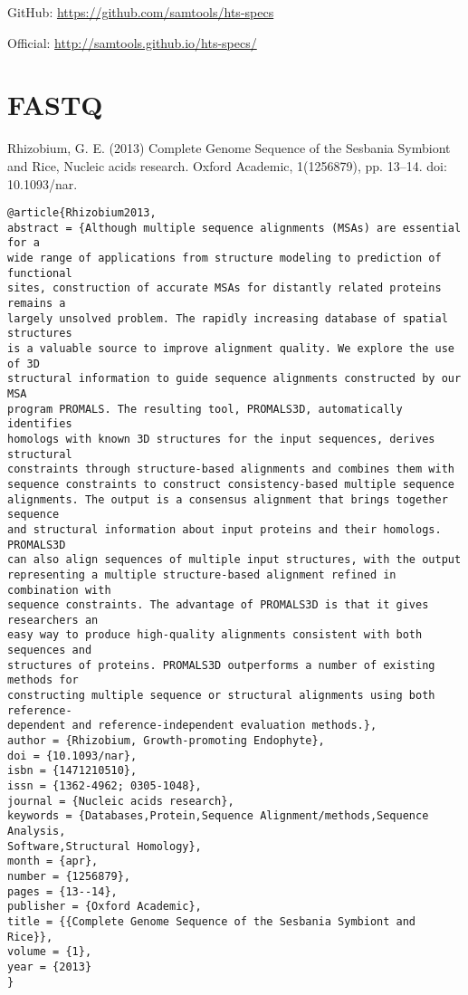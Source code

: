 \documentclass[]{article}
\begin{document}
GitHub: \url{https://github.com/samtools/hts-specs}

Official: \url{http://samtools.github.io/hts-specs/}

\section{FASTQ}

Rhizobium, G. E. (2013) Complete Genome Sequence of the Sesbania Symbiont and Rice, Nucleic acids research. Oxford Academic, 1(1256879), pp. 13–14. doi: 10.1093/nar.

\begin{verbatim}
@article{Rhizobium2013,
abstract = {Although multiple sequence alignments (MSAs) are essential for a
wide range of applications from structure modeling to prediction of functional
sites, construction of accurate MSAs for distantly related proteins remains a
largely unsolved problem. The rapidly increasing database of spatial structures
is a valuable source to improve alignment quality. We explore the use of 3D
structural information to guide sequence alignments constructed by our MSA
program PROMALS. The resulting tool, PROMALS3D, automatically identifies
homologs with known 3D structures for the input sequences, derives structural
constraints through structure-based alignments and combines them with
sequence constraints to construct consistency-based multiple sequence
alignments. The output is a consensus alignment that brings together sequence
and structural information about input proteins and their homologs. PROMALS3D
can also align sequences of multiple input structures, with the output
representing a multiple structure-based alignment refined in combination with
sequence constraints. The advantage of PROMALS3D is that it gives researchers an
easy way to produce high-quality alignments consistent with both sequences and
structures of proteins. PROMALS3D outperforms a number of existing methods for
constructing multiple sequence or structural alignments using both reference-
dependent and reference-independent evaluation methods.},
author = {Rhizobium, Growth-promoting Endophyte},
doi = {10.1093/nar},
isbn = {1471210510},
issn = {1362-4962; 0305-1048},
journal = {Nucleic acids research},
keywords = {Databases,Protein,Sequence Alignment/methods,Sequence Analysis,
Software,Structural Homology},
month = {apr},
number = {1256879},
pages = {13--14},
publisher = {Oxford Academic},
title = {{Complete Genome Sequence of the Sesbania Symbiont and Rice}},
volume = {1},
year = {2013}
}
\end{verbatim}
\end{document}
